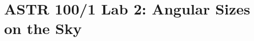 \documentclass[main.tex]{subfiles}
\begin{document}
\section*{ASTR 100/1 Lab 2: Angular Sizes on the Sky}
\end{document}
